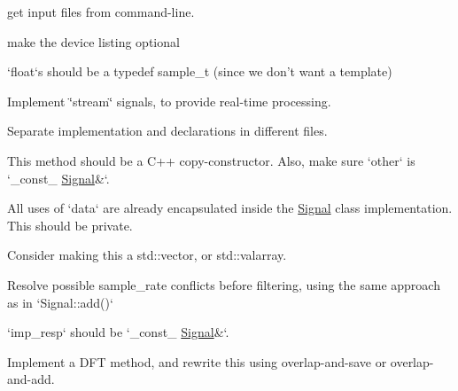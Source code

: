 
\begin{DoxyRefList}
\item[\label{todo__todo000002}%
\hypertarget{todo__todo000002}{}%
\-Member \hyperlink{main_8cpp_a0ddf1224851353fc92bfbff6f499fa97}{main} (int argc, char $\ast$argv\mbox{[}\mbox{]})]get input files from command-\/line. 
\item[\label{todo__todo000001}%
\hypertarget{todo__todo000001}{}%
\-Member \hyperlink{main_8cpp_a501afa2e5f0615b9c24cb345fbd5724e}{portaudio\-\_\-init} ()]make the device listing optional  
\item[\label{todo__todo000004}%
\hypertarget{todo__todo000004}{}%
\-Class \hyperlink{classSignal}{\-Signal} ]`float`s should be a typedef sample\-\_\-t (since we don't want a template)

\-Implement \char`\"{}stream\char`\"{} signals, to provide real-\/time processing.  
\item[\label{todo__todo000003}%
\hypertarget{todo__todo000003}{}%
\-File \hyperlink{Signal_8h}{\-Signal.h} ]\-Separate implementation and declarations in different files. 
\item[\label{todo__todo000006}%
\hypertarget{todo__todo000006}{}%
\-Member \hyperlink{classSignal_aeb64be9cdd11502baf340a9afe90ec51}{\-Signal\-:\-:copyfrom} (\hyperlink{classSignal}{\-Signal} \&other)]\-This method should be a \-C++ copy-\/constructor. \-Also, make sure `other` is `\-\_\-const\-\_\- \hyperlink{classSignal}{\-Signal}\&`.  
\item[\label{todo__todo000013}%
\hypertarget{todo__todo000013}{}%
\-Member \hyperlink{classSignal_aa9322b424cb7f66597c8ab19ac402423}{\-Signal\-:\-:data} ]\-All uses of `data` are already encapsulated inside the \hyperlink{classSignal}{\-Signal} class implementation. \-This should be private.

\-Consider making this a std\-::vector, or std\-::valarray.  
\item[\label{todo__todo000009}%
\hypertarget{todo__todo000009}{}%
\-Member \hyperlink{classSignal_a9a7011d55cd3eba679b78a3025953a25}{\-Signal\-:\-:filter} (\hyperlink{classSignal}{\-Signal} \&imp\-\_\-resp, \hyperlink{classSignal}{\-Signal} \&conv)]\-Resolve possible sample\-\_\-rate conflicts before filtering, using the same approach as in `\-Signal\-::add()`

`imp\-\_\-resp` should be `\-\_\-const\-\_\- \hyperlink{classSignal}{\-Signal}\&`.

\-Implement a \-D\-F\-T method, and rewrite this using overlap-\/and-\/save or overlap-\/and-\/add.


\end{DoxyRefList}
